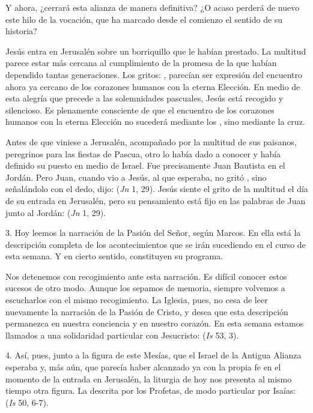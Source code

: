 \begin{body}
Y ahora, ¿cerrará esta alianza de manera definitiva? ¿O acaso perderá de nuevo este hilo de la vocación, que ha marcado desde el comienzo el sentido de su historia?

Jesús entra en Jerusalén sobre un borriquillo que le habían prestado. La multitud parece estar más cercana al cumplimiento de la promesa de la que habían dependido tantas generaciones. Los gritos:  , parecían ser expresión del encuentro ahora ya cercano de los corazones humanos con la eterna Elección. En medio de esta alegría que precede a las solemnidades pascuales, Jesús está recogido y silencioso. Es plenamente consciente de que el encuentro de los corazones humanos con la eterna Elección no sucederá mediante los , sino mediante la cruz.

Antes de que viniese a Jerusalén, acompañado por la multitud de sus paisanos, peregrinos para las fiestas de Pascua, otro lo había dado a conocer y había definido su puesto en medio de Israel. Fue precisamente Juan Bautista en el Jordán. Pero Juan, cuando vio a Jesús, al que esperaba, no gritó , sino señalándolo con el dedo, dijo:  (\textit{Jn} 1, 29). Jesús siente el grito de la multitud el día de su entrada en Jerusalén, pero su pensamiento está fijo en las palabras de Juan junto al Jordán:  (\textit{Jn} 1, 29).

3. Hoy leemos la narración de la Pasión del Señor, según Marcos. En ella está la descripción completa de los acontecimientos que se irán sucediendo en el curso de esta semana. Y en cierto sentido, constituyen su programa.

Nos detenemos con recogimiento ante esta narración. Es difícil conocer estos sucesos de otro modo. Aunque los sepamos de memoria, siempre volvemos a escucharlos con el mismo recogimiento.  La Iglesia, pues, no cesa de leer nuevamente la narración de la Pasión de Cristo, y desea que esta descripción permanezca en nuestra conciencia y en nuestro corazón. En esta semana estamos llamados a una solidaridad particular con Jesucristo:  (\textit{Is} 53, 3).

4. Así, pues, junto a la figura de este Mesías, que el Israel de la Antigua Alianza esperaba y, más aún, que parecía haber alcanzado ya con la propia fe en el momento de la entrada en Jerusalén, la liturgia de hoy nos presenta al mismo tiempo otra figura. La descrita por los Profetas, de modo particular por Isaías:  (\textit{Is} 50, 6-7).


\end{body}
